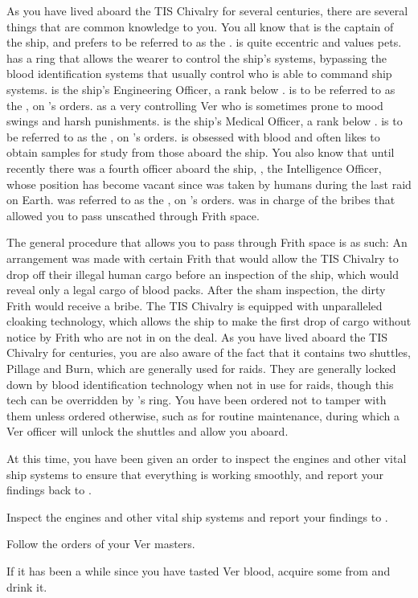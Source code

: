 \documentclass[blue]{guildcamp4}
\begin{document}
As you have lived aboard the TIS Chivalry for several centuries, there are several things that are common knowledge to you. You all know that \cVone{} is the captain of the ship, and prefers to be referred to as the \cVone{\Duke}. \cVone{} is quite eccentric and values \cVone{\their} pets. \cVone{} has a ring that allows the wearer to control the ship's systems, bypassing the blood identification systems that usually control who is able to command ship systems. \cVtwo{} is the ship's Engineering Officer, a rank below \cVone{}. \cVtwo{} is to be referred to as the \cVtwo{\Marq}, on \cVone{}'s orders. \cVtwo{} as a very controlling Ver who is sometimes prone to mood swings and harsh punishments. \cVthree{} is the ship's Medical Officer, a rank below \cVtwo{}. \cVthree{} is to be referred to as the \cVthree{\Baron}, on \cVone{}'s orders. \cVthree{} is obsessed with blood and often likes to obtain samples for study from those aboard the ship. You also know that until recently there was a fourth officer aboard the ship, \cIntel{}, the Intelligence Officer, whose position has become vacant since \cIntel{\they} was taken by humans during the last raid on Earth. \cIntel{} was referred to as the \cIntel{\Count}, on \cVone{}'s orders. \cIntel{} was in charge of the bribes that allowed you to pass unscathed through Frith space.

The general procedure that allows you to pass through Frith space is as such: An arrangement was made with certain Frith that would allow the TIS Chivalry to drop off their illegal human cargo before an inspection of the ship, which would reveal only a legal cargo of blood packs. After the sham inspection, the dirty Frith would receive a bribe. The TIS Chivalry is equipped with unparalleled cloaking technology, which allows the ship to make the first drop of cargo without notice by Frith who are not in on the deal. As you have lived aboard the TIS Chivalry for centuries, you are also aware of the fact that it contains two shuttles, Pillage and Burn, which are generally used for raids. They are generally locked down by blood identification technology when not in use for raids, though this tech can be overridden by \cVone{}'s ring. You have been ordered not to tamper with them unless ordered otherwise, such as for routine maintenance, during which a Ver officer will unlock the shuttles and allow you aboard.

At this time, you have been given an order to inspect the engines and other vital ship systems to ensure that everything is working smoothly, and report your findings back to \cVtwo{}.

\begin{itemz}[Goals]
	\item Inspect the engines and other vital ship systems and report your findings to \cVtwo{}.
	\item Follow the orders of your Ver masters.
	\item If it has been a while since you have tasted Ver blood, acquire some from \cVone{} and drink it.
\end{itemz}

\begin{members}
	\member{\cJoan{}} 
	\member{\cJulie{}} 
	\member{\cJames{}} 
	\member{\cRasputin{}} 
\end{members}
\end{document}
